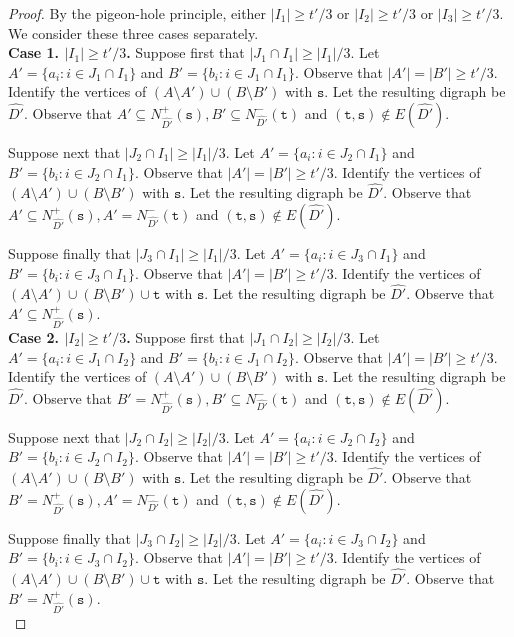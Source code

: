 \documentclass[a4paper,11pt]{article}
\theoremstyle{plain}
\newtheorem{identification rule}{Identification Rule}
\theoremstyle{definition}
\theoremstyle{remark}
\newcommand{\sss}{\texttt{s}}
\newcommand{\ttt}{\texttt{t}}
\begin{document}
\begin{proof}
By the pigeon-hole principle, either $|I_1| \geq t'/3$ or $|I_2| \geq t'/3$ or $|I_3| \geq t'/3$. We consider these three cases separately.\\

\noindent
{\bf Case 1. $|I_1| \geq t'/3$.} Suppose first that $|J_1 \cap I_1| \geq |I_1|/3$. Let $A' =\{a_i: i \in J_1 \cap I_1\}$ and $B' =\{b_i: i \in J_1 \cap I_1\}$. Observe that $|A'|=|B'| \geq t'/3$. Identify the vertices of $(A\setminus A') \cup (B \setminus B')$ with $\sss$. Let the resulting digraph be  $\widehat{D'}$. Observe that $A' \subseteq N^+_{\widehat{D'}}(\sss), B' \subseteq N^-_{\widehat{D'}}(\ttt)$ and $(\ttt, \sss) \not \in E(\widehat{D'})$.

Suppose next that $|J_2 \cap I_1| \geq |I_1|/3$. Let $A' =\{a_i:  i \in J_2 \cap I_1\}$ and $B' =\{b_i:  i \in J_2 \cap I_1\}$. Observe that $|A'|=|B'| \geq t'/3$. Identify the vertices of $(A\setminus A') \cup (B \setminus B')$ with $\sss$. Let the resulting digraph be  $\widehat{D'}$. Observe that $A' \subseteq N^+_{\widehat{D'}}(\sss), A' = N^-_{\widehat{D'}}(\ttt)$ and $(\ttt,\sss) \not \in E(\widehat{D'})$.

Suppose finally that $|J_3 \cap I_1| \geq |I_1|/3$. Let $A' =\{a_i:  i \in J_3 \cap I_1\}$ and $B' =\{b_i:  i \in J_3 \cap I_1\}$. Observe that $|A'|=|B'| \geq t'/3$.  Identify the vertices of $(A\setminus A') \cup (B \setminus B') \cup \ttt$ with $\sss$. Let the resulting digraph be  $\widehat{D'}$. Observe that $A' \subseteq N^+_{\widehat{D'}}(\sss)$.\\

\noindent
{\bf Case 2. $|I_2| \geq t'/3$.} Suppose first that $|J_1 \cap I_2| \geq |I_2|/3$. Let $A' =\{a_i:  i \in J_1 \cap I_2\}$ and $B' =\{b_i: i \in J_1 \cap I_2\}$. Observe that $|A'|=|B'| \geq t'/3$.
Identify the vertices of $(A\setminus A') \cup (B \setminus B')$ with $\sss$. Let the resulting digraph be  $\widehat{D'}$. Observe that $B' = N^+_{\widehat{D'}}(\sss), B' \subseteq N^-_{\widehat{D'}}(\ttt)$ and $(\ttt,\sss) \not \in E(\widehat{D'})$.

Suppose next that $|J_2 \cap I_2| \geq |I_2|/3$. Let $A' =\{a_i: i \in J_2 \cap I_2\}$ and $B' =\{b_i:  i \in J_2 \cap I_2\}$. Observe that $|A'|=|B'| \geq t'/3$.
Identify the vertices of $(A\setminus A') \cup (B \setminus B')$ with $\sss$. Let the resulting digraph be  $\widehat{D'}$. Observe that  $B' = N^+_{\widehat{D'}}(\sss), A' = N^-_{\widehat{D'}}(\ttt)$ and $(\ttt,\sss) \not \in E(\widehat{D'})$.

Suppose finally that $|J_3 \cap I_2| \geq |I_2|/3$. Let $A' =\{a_i:  i \in J_3 \cap I_2\}$ and $B' =\{b_i:  i \in J_3 \cap I_2\}$. Observe that $|A'|=|B'| \geq t'/3$.
Identify the vertices of $(A\setminus A') \cup (B \setminus B') \cup \ttt$ with $\sss$. Let the resulting digraph be $\widehat{D'}$. Observe that $B' = N^+_{\widehat{D'}}(\sss)$. \\


\end{proof}
\end{document}
